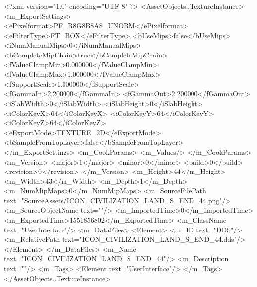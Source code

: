 <?xml version="1.0" encoding="UTF-8" ?>
<AssetObjects..TextureInstance>
	<m_ExportSettings>
		<ePixelformat>PF_R8G8B8A8_UNORM</ePixelformat>
		<eFilterType>FT_BOX</eFilterType>
		<bUseMips>false</bUseMips>
		<iNumManualMips>0</iNumManualMips>
		<bCompleteMipChain>true</bCompleteMipChain>
		<fValueClampMin>0.000000</fValueClampMin>
		<fValueClampMax>1.000000</fValueClampMax>
		<fSupportScale>1.000000</fSupportScale>
		<fGammaIn>2.200000</fGammaIn>
		<fGammaOut>2.200000</fGammaOut>
		<iSlabWidth>0</iSlabWidth>
		<iSlabHeight>0</iSlabHeight>
		<iColorKeyX>64</iColorKeyX>
		<iColorKeyY>64</iColorKeyY>
		<iColorKeyZ>64</iColorKeyZ>
		<eExportMode>TEXTURE_2D</eExportMode>
		<bSampleFromTopLayer>false</bSampleFromTopLayer>
	</m_ExportSettings>
	<m_CookParams>
		<m_Values/>
	</m_CookParams>
	<m_Version>
		<major>1</major>
		<minor>0</minor>
		<build>0</build>
		<revision>0</revision>
	</m_Version>
	<m_Height>44</m_Height>
	<m_Width>43</m_Width>
	<m_Depth>1</m_Depth>
	<m_NumMipMaps>0</m_NumMipMaps>
	<m_SourceFilePath text="SourceAssets/ICON_CIVILIZATION_LAND_S_END_44.png"/>
	<m_SourceObjectName text=""/>
	<m_ImportedTime>0</m_ImportedTime>
	<m_ExportedTime>1551856802</m_ExportedTime>
	<m_ClassName text="UserInterface"/>
	<m_DataFiles>
		<Element>
			<m_ID text="DDS"/>
			<m_RelativePath text="ICON_CIVILIZATION_LAND_S_END_44.dds"/>
		</Element>
	</m_DataFiles>
	<m_Name text="ICON_CIVILIZATION_LAND_S_END_44"/>
	<m_Description text=""/>
	<m_Tags>
		<Element text="UserInterface"/>
	</m_Tags>
</AssetObjects..TextureInstance>

